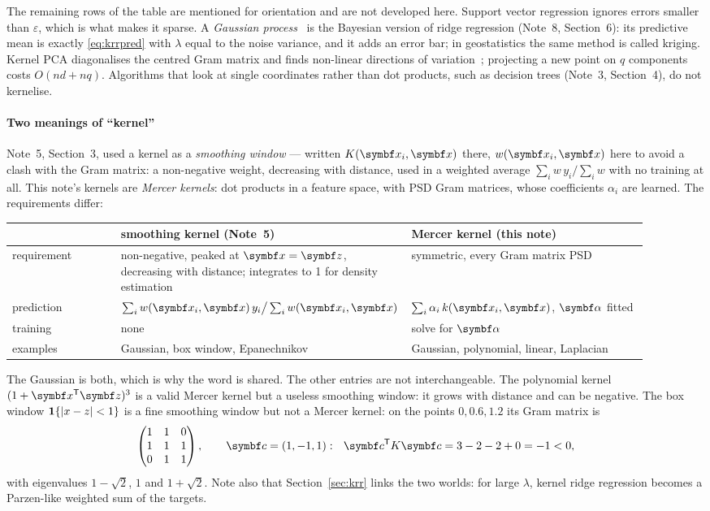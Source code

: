 \documentclass[11pt]{article}
\newcommand{\z}{\vect{z}}
\newcommand{\valpha}{\vect{\alpha}}
\begin{document}
The remaining rows of the table are mentioned for orientation and are not developed here. Support vector regression ignores errors smaller than
$\varepsilon$, which is what makes it sparse. A \emph{Gaussian process}~\cite{rasmussen2006} is the Bayesian version of
ridge regression (Note~8, Section~6): its predictive mean is exactly \eqref{eq:krrpred} with $\lambda$ equal to the noise
variance, and it adds an error bar; in geostatistics the same method is called kriging. Kernel PCA diagonalises the
centred Gram matrix and finds non-linear directions of variation~\cite{scholkopf1998}; projecting a new point on $q$
components costs $O(nd + nq)$. Algorithms that look at single coordinates rather than dot products, such as decision trees
(Note~3, Section~4), do not kernelise.

\paragraph{Two meanings of ``kernel''} Note~5, Section~3, used a kernel as a \emph{smoothing window} --- written
$K(\x_i, \x)$ there, $w(\x_i, \x)$ here to avoid a clash with the Gram matrix: a non-negative weight, decreasing with
distance, used in a weighted average $\sum_i w\,y_i / \sum_i w$ with no training at all. This note's kernels are
\emph{Mercer kernels}: dot products in a feature space, with PSD Gram matrices, whose coefficients $\alpha_i$ are
learned. The requirements differ:
\begin{center}\small
\begin{tabular}{@{}L{0.17\linewidth}L{0.37\linewidth}L{0.37\linewidth}@{}}
\toprule
& smoothing kernel (Note~5) & Mercer kernel (this note) \\
\midrule
requirement & non-negative, peaked at $\x = \z$, decreasing with distance; integrates to 1 for density estimation &
symmetric, every Gram matrix PSD \\
prediction & $\sum_i w(\x_i, \x)\,y_i \big/ \sum_i w(\x_i, \x)$ & $\sum_i \alpha_i\, k(\x_i, \x)$, $\valpha$ fitted \\
training & none & solve for $\valpha$ \\
examples & Gaussian, box window, Epanechnikov & Gaussian, polynomial, linear, Laplacian \\
\bottomrule
\end{tabular}
\end{center}
The Gaussian is both, which is why the word is shared. The other entries are not interchangeable. The polynomial kernel
$(1 + \x\T\z)^3$ is a valid Mercer kernel but a useless smoothing window: it grows with distance and can be negative. The box
window $\mathbf{1}\!\left\{|x - z| < 1\right\}$ is a fine smoothing window but not a Mercer kernel: on the points $0, 0.6, 1.2$ its Gram matrix is
\[
  \begin{pmatrix} 1 & 1 & 0 \\ 1 & 1 & 1 \\ 0 & 1 & 1 \end{pmatrix}, \qquad \vect{c} = (1, -1, 1):\ \
  \vect{c}\T K\vect{c} = 3 - 2 - 2 + 0 = -1 < 0 ,
\]
with eigenvalues $1 - \sqrt2$, $1$ and $1 + \sqrt2$. Note also that Section~\ref{sec:krr} links the two worlds: for large
$\lambda$, kernel ridge regression becomes a Parzen-like weighted sum of the targets.
\end{document}
